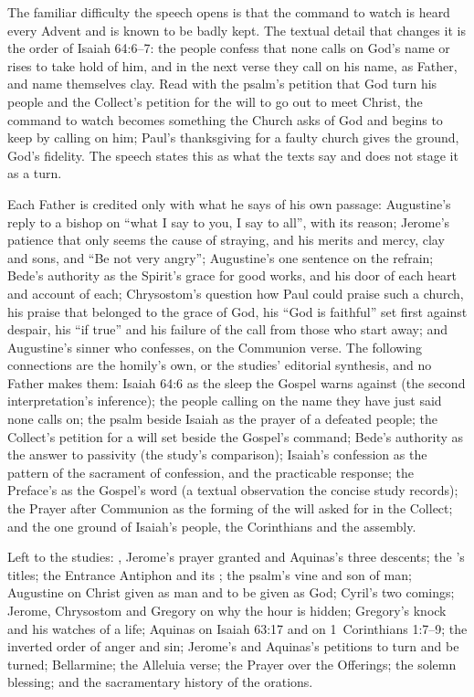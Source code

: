{The familiar difficulty the speech opens is that the command to watch is
heard every Advent and is known to be badly kept. The textual detail that
changes it is the order of Isaiah 64:6--7: the people confess that none
calls on God's name or rises to take hold of him, and in the next verse they
call on his name, as Father, and name themselves clay. Read with the psalm's
petition that God turn his people and the Collect's petition for the will to
go out to meet Christ, the command to watch becomes something the Church asks
of God and begins to keep by calling on him; Paul's thanksgiving for a
faulty church gives the ground, God's fidelity. The speech states this as
what the texts say and does not stage it as a turn.

Each Father is credited only with what he says of his own passage:
Augustine's reply to a bishop on ``what I say to you, I say to all'', with its
reason; Jerome's patience that only seems the cause of straying, and his
merits and mercy, clay and sons, and ``Be not very angry''; Augustine's one
sentence on the refrain; Bede's authority as the Spirit's grace for good
works, and his door of each heart and account of each; Chrysostom's question
how Paul could praise such a church, his praise that belonged to the grace of
God, his ``God is faithful'' set first against despair, his ``if true'' and his
failure of the call from those who start away; and Augustine's sinner who
confesses, on the Communion verse. The following connections are the
homily's own, or the studies' editorial synthesis, and no Father makes them:
Isaiah 64:6 as the sleep the Gospel warns against (the second
interpretation's inference); the people calling on the name they have just
said none calls on; the psalm beside Isaiah as the prayer of a defeated
people; the Collect's petition for a will set beside the Gospel's command;
Bede's authority as the answer to passivity (the study's comparison);
Isaiah's confession as the pattern of the sacrament of confession, and the
practicable response; the Preface's  as the Gospel's word
(a textual observation the concise study records); the Prayer after
Communion as the forming of the will asked for in the Collect; and the one
ground of Isaiah's people, the Corinthians and the assembly.

Left to the studies: , Jerome's prayer granted and
Aquinas's three descents; the 's titles; the Entrance Antiphon and
its ; the psalm's vine and son of man; Augustine on
Christ given as man and to be given as God; Cyril's two comings; Jerome,
Chrysostom and Gregory on why the hour is hidden; Gregory's knock and his
watches of a life; Aquinas on Isaiah 63:17 and on 1~Corinthians 1:7--9;
the inverted order of anger and sin; Jerome's and Aquinas's petitions to turn
and be turned; Bellarmine; the Alleluia verse; the Prayer over the Offerings;
the solemn blessing; and the sacramentary history of the orations.

}
